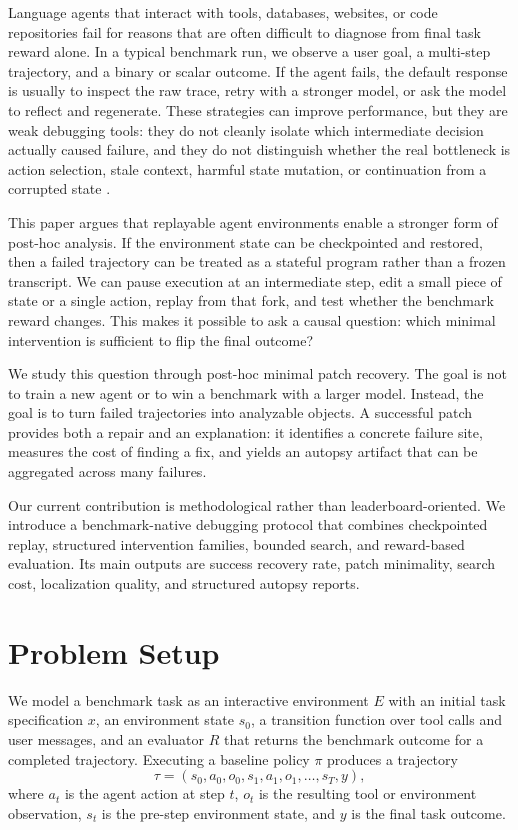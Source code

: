 \documentclass[11pt]{article}
\begin{document}
Language agents that interact with tools, databases, websites, or code
repositories fail for reasons that are often difficult to diagnose from final
task reward alone. In a typical benchmark run, we observe a user goal, a
multi-step trajectory, and a binary or scalar outcome. If the agent fails, the
default response is usually to inspect the raw trace, retry with a stronger
model, or ask the model to reflect and regenerate. These strategies can improve
performance, but they are weak debugging tools: they do not cleanly isolate
which intermediate decision actually caused failure, and they do not
distinguish whether the real bottleneck is action selection, stale context,
harmful state mutation, or continuation from a corrupted state
\citep{tau_style,web_arena,work_arena,swe_bench,reflexion,self_refine,tree_of_thoughts}.

This paper argues that replayable agent environments enable a stronger form of
post-hoc analysis. If the environment state can be checkpointed and restored,
then a failed trajectory can be treated as a stateful program rather than a
frozen transcript. We can pause execution at an intermediate step, edit a small
piece of state or a single action, replay from that fork, and test whether the
benchmark reward changes. This makes it possible to ask a causal question:
which minimal intervention is sufficient to flip the final outcome?

We study this question through post-hoc minimal patch recovery. The goal is not
to train a new agent or to win a benchmark with a larger model. Instead, the
goal is to turn failed trajectories into analyzable objects. A successful patch
provides both a repair and an explanation: it identifies a concrete failure
site, measures the cost of finding a fix, and yields an autopsy artifact that
can be aggregated across many failures.

Our current contribution is methodological rather than leaderboard-oriented. We
introduce a benchmark-native debugging protocol that combines checkpointed
replay, structured intervention families, bounded search, and reward-based
evaluation. Its main outputs are success recovery rate, patch minimality,
search cost, localization quality, and structured autopsy reports.

\section{Problem Setup}

We model a benchmark task as an interactive environment $E$ with an initial
task specification $x$, an environment state $s_0$, a transition function over
tool calls and user messages, and an evaluator $R$ that returns the benchmark
outcome for a completed trajectory. Executing a baseline policy $\pi$ produces
a trajectory
\[
\tau = (s_0, a_0, o_0, s_1, a_1, o_1, \ldots, s_T, y),
\]
where $a_t$ is the agent action at step $t$, $o_t$ is the resulting tool or
environment observation, $s_t$ is the pre-step environment state, and $y$ is
the final task outcome.
\end{document}
